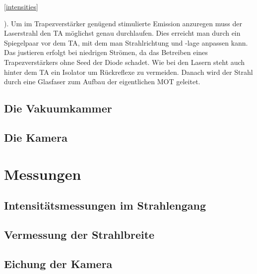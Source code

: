 \documentclass[12pt, a4paper]{article}
\begin{document}
    \ref{intensities}
    
    ). Um im Trapezverstärker genügend stimulierte Emission anzuregen
    muss der Laserstrahl den TA möglichst genau durchlaufen. Dies erreicht man durch
    ein Spiegelpaar vor dem TA, mit dem man Strahlrichtung und -lage anpassen kann. Das
    justieren erfolgt bei niedrigen Strömen, da das Betreiben eines Trapezverstärkers
    ohne Seed der Diode schadet. Wie bei den Lasern steht auch hinter dem TA ein
    Isolator um Rückreflexe zu vermeiden. Danach wird der Strahl durch eine Glasfaser
    zum Aufbau der eigentlichen MOT geleitet.
  \subsection{Die Vakuumkammer}
  \subsection{Die Kamera}
\newpage
\section{Messungen}
  \subsection{Intensitätsmessungen im Strahlengang}
  \subsection{Vermessung der Strahlbreite}
  \subsection{Eichung der Kamera}
\end{document}
